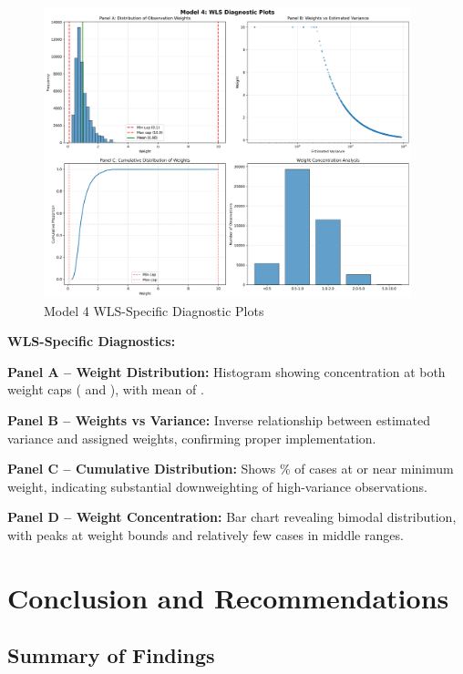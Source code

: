 \begin{figure}[h]
\centering
\includegraphics[width=0.95\textwidth]{models/model_4/wls_diagnostics.png}
\caption{Model 4 WLS-Specific Diagnostic Plots}
\label{fig:model4_wls_diagnostics}
\end{figure}

\textbf{WLS-Specific Diagnostics:}

\textbf{Panel A -- Weight Distribution:} Histogram showing concentration at both weight caps (\ModelFourWeightMin{} and \ModelFourWeightMax{}), with mean of \ModelFourWeightMean{}.

\textbf{Panel B -- Weights vs Variance:} Inverse relationship between estimated variance and assigned weights, confirming proper implementation.

\textbf{Panel C -- Cumulative Distribution:} Shows \ModelFourWeightAtMinPct{}\% of cases at or near minimum weight, indicating substantial downweighting of high-variance observations.

\textbf{Panel D -- Weight Concentration:} Bar chart revealing bimodal distribution, with peaks at weight bounds and relatively few cases in middle ranges.

\section{Conclusion and Recommendations}

\subsection{Summary of Findings}

